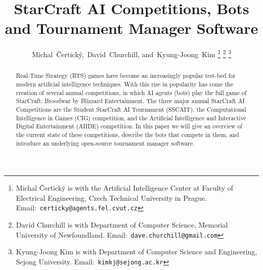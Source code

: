 \documentclass[journal]{IEEEtran}
\begin{document}
\title{StarCraft AI Competitions, Bots\\ and Tournament Manager Software}

\author{Michal~\v{C}ertick\'{y},~David~Churchill, and~Kyung-Joong~Kim%
\thanks{Michal \v{C}ertick\'{y} is with the Artificial Intelligence Center at Faculty of Electrical Engineering, Czech Technical University in Prague. Email:~\tt{certicky@agents.fel.cvut.cz}}%
\thanks{David Churchill is with Department of Computer Science, Memorial University of Newfoundland. Email:~\tt{dave.churchill@gmail.com}}%
\thanks{Kyung-Joong Kim is with Department of Computer Science and Engineering, Sejong University. Email:~\tt{kimkj@sejong.ac.kr}}%
}

% 


\maketitle
\begin{abstract}
Real-Time Strategy (RTS) games have become an increasingly popular test-bed for modern artificial intelligence techniques. With this rise in popularity has come the creation of several annual competitions, in which AI agents (bots) play the full game of StarCraft: Broodwar by Blizzard Entertainment. The three major annual StarCraft AI Competitions are the Student StarCraft AI Tournament (SSCAIT), the Computational Intelligence in Games (CIG) competition, and the Artificial Intelligence and Interactive Digital Entertainment (AIIDE) competition. In this paper we will give an overview of the current state of these competitions, describe the bots that compete in them, and introduce an underlying open-source tournament manager software. 
\end{abstract}

%
\IEEEpeerreviewmaketitle
\end{document}
